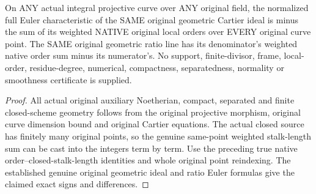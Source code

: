 \begin{theorem}
\label{thm:fc-curve-cartier-weighted-degree}
\leanok
{}
On ANY actual integral projective curve over ANY original field, the
normalized full Euler characteristic of the SAME original geometric
Cartier ideal is minus the sum of its weighted NATIVE original local orders
over EVERY original curve point. The SAME original geometric ratio line
has its denominator's weighted native order sum minus its numerator's.
No support, finite-divisor, frame, local-order, residue-degree, numerical,
compactness, separatedness, normality or smoothness certificate is supplied.
\end{theorem}
\begin{proof}
All actual original auxiliary Noetherian, compact, separated and finite
closed-scheme geometry follows from the original projective morphism,
original curve dimension bound and original Cartier equations. The actual
closed source has finitely many original points, so the genuine same-point
weighted stalk-length sum can be cast into the integers term by term.
Use the preceding true native order--closed-stalk-length identities and
whole original point reindexing. The established genuine original geometric
ideal and ratio Euler formulas give the claimed exact signs and differences.
\end{proof}
